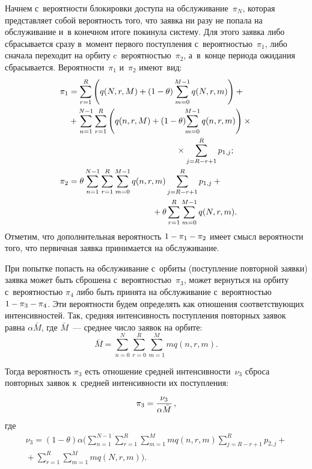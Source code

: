 \begin{multicols}{2}
Начнем с~ве\-ро\-ят\-ности блокировки доступа на обслуживание~$\pi_N$, которая 
пред\-став\-ля\-ет собой ве\-ро\-ят\-ность того, что за\-яв\-ка ни разу не попала на 
обслуживание и~в конечном итоге покинула сис\-те\-му. Для этого заявка либо 
сбрасывается сразу в~момент пер\-во\-го поступления с~ве\-ро\-ят\-ностью~$\pi_1$, либо 
сначала переходит на орбиту c~ве\-ро\-ят\-ностью~$\pi_2$, а~в~конце периода ожидания 
сбрасывается. Вероятности~$\pi_1$ и~$\pi_2$ име\-ют~вид:
\begin{align*} 
   \pi_1 &= \sum\limits_{r=1}^R \left( q(N,r,M)+ (1-\theta) \sum\limits_{m=0}^{M-1} q(N,r,m) 
\right) + {}\\
   & {}+ \sum\limits_{n=1}^{N-1} \sum\limits_{r=1}^R \left(q(n,r,M)+ (1-\theta) \!\! \sum\limits_{m=0}^{M-1} q(n,r,m) \right) \times{}\\
   &\hspace*{45mm}{}\times \sum\limits_{j=R-r+1}^R p_{1,j}; \\
   \pi_2 &= \theta \sum\limits_{n=1}^{N-1}\sum\limits_{r=1}^R  \sum\limits_{m=0}^{M-1} q(n,r,m) 
\sum\limits_{j=R-r+1}^R p_{1,j} +{}\\
&\hspace*{35mm}{}+
   \theta \sum\limits_{r=1}^R \sum\limits_{m=0}^{M-1} q(N,r,m).
\end{align*}
Отметим, что дополнительная ве\-ро\-ят\-ность $1\hm-\pi_ 1\hm-\pi_ 2$ имеет смысл 
ве\-ро\-ят\-ности того, что первичная заявка принимается на об\-слу\-жи\-ва\-ние.

При попытке попасть на обслуживание с~орбиты (по\-ступ\-ле\-ние повторной заявки) 
заявка может быть сброшена с~ве\-ро\-ят\-ностью~$\pi_3$, может вернуться на орбиту 
с~ве\-ро\-ят\-ностью $\pi_4$ либо быть принята на обслуживание с~ве\-ро\-ят\-ностью $1\hm-\pi_3\hm-\pi_4$. Эти вероятности будем определять как отношения 
со\-от\-вет\-ст\-ву\-ющих 
интенсивностей. Так, сред\-няя ин\-тен\-сив\-ность по\-ступ\-ле\-ния по\-втор\-ных заявок равна 
$\alpha \bar{M}$, где $\bar{M}$~--- сред\-нее чис\-ло заявок на орбите:
$$ 
\bar{M}=\sum\limits_{n=0}^N \sum\limits_{r=0}^R \sum\limits_{m=1}^M m q(n,r,m).
$$


Тогда вероятность $\pi_3$ есть отношение сред\-ней ин\-тен\-сив\-ности~$\nu_3$ сброса 
повторных заявок к~сред\-ней ин\-тен\-сив\-ности их по\-ступ\-ле\-ния: 
$$
\pi_3=\displaystyle\frac{\displaystyle {\nu_3}\mathstrut}{\displaystyle \alpha \bar{M}\mathstrut}\,,
$$ где
\begin{multline*} 
   \nu_3=(1-\theta) \alpha  \Bigg(  \sum\limits_{n=1}^{N-1}\sum\limits_{r=1}^R \sum\limits_{m=1}^M m q(n,r,m) \!\!\!\!\sum\limits_{j=R-r+1}^R 
\!\!\! \!p_{2,j} +{}\\
   {}+\!\! \sum\limits_{r=1}^R \sum\limits_{m=1}^M\! mq(N,r,m)  \Bigg).
\end{multline*}


\end{multicols}
